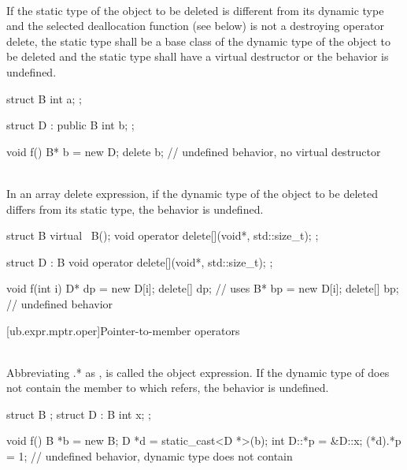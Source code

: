 \pnum
{} \\
If the static type of the object to be deleted is different from its dynamic
type and the selected deallocation function (see below) is not a destroying operator delete, the static type
shall be a base class of the dynamic type of the object to be deleted and the static type shall have a virtual
destructor or the behavior is undefined.

\pnum
\begin{example}
\begin{codeblock}
struct B {
  int a;
};

struct D : public B {
  int b;
};

void f() {
  B* b = new D;
  delete b;             // undefined behavior, no virtual destructor
}
\end{codeblock}
\end{example}


\pnum
{} \\
In an array delete expression, if the dynamic type of the object to be deleted differs from its static type, the behavior is undefined.

\pnum
\begin{example}
\begin{codeblock}
struct B {
  virtual ~B();
  void operator delete[](void*, std::size_t);
};

struct D : B {
  void operator delete[](void*, std::size_t);
};

void f(int i) {
  D* dp = new D[i];
  delete[] dp;          // uses 
  B* bp = new D[i];
  delete[] bp;          // undefined behavior
}
\end{codeblock}
\end{example}


[ub.expr.mptr.oper]{Pointer-to-member operators}

\pnum
{} \\
Abbreviating .* as ,  is called the object expression. If the dynamic type
of  does not contain the member to which  refers, the behavior is undefined.

\pnum
\begin{example}
\begin{codeblock}
struct B {};
struct D : B {
  int x;
};

void f() {
  B *b = new B;
  D *d = static_cast<D *>(b);
  int D::*p = &D::x;
  (*d).*p = 1;          // undefined behavior, dynamic type  does not contain 
}
\end{codeblock}
\end{example}


